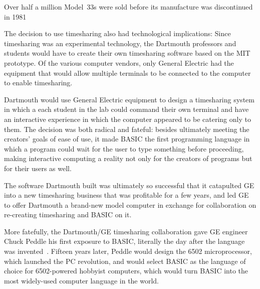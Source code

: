 \begin{geeknote}{}
Over half a million Model~33s were sold before its manufacture was
discontinued in 1981
\end{geeknote}

The decision to use timesharing also had technological implications:
Since timesharing was an experimental technology, the Dartmouth
professors and students would have to create their own
timesharing software based on the MIT prototype.  Of the various
computer vendors, only General Electric had the equipment that would
allow multiple terminals to be connected to the computer to enable
timesharing. 

Dartmouth would use General Electric equipment to design a timesharing
system in which a each student in the lab could command their own
terminal and have an interactive experience in which the computer
appeared to be catering only to them.
The decision was both radical and fateful: besides ultimately meeting
the creators' goals of ease of use, it made BASIC the first programming
language in which a program could wait for the user to type
something before proceeding, making interactive computing a reality not
only for the creators of programs but for their users as well.

The software Dartmouth built was ultimately so successful that it
catapulted GE into a new timesharing business that was profitable for a
few years, and led GE to offer Dartmouth a brand-new model computer in
exchange for collaboration on re-creating timesharing and BASIC on it.
 
More fatefully, the Dartmouth/GE timesharing collaboration
gave GE engineer Chuck Peddle his first exposure to
BASIC, literally the day after the language was
invented~\cite[p.~5]{commodore}.
Fifteen years later, Peddle would design the 6502 microprocessor, which launched
the PC revolution, and would select BASIC as the language of choice for
6502-powered hobbyist computers, which would turn BASIC into the most
widely-used computer language in the world.





